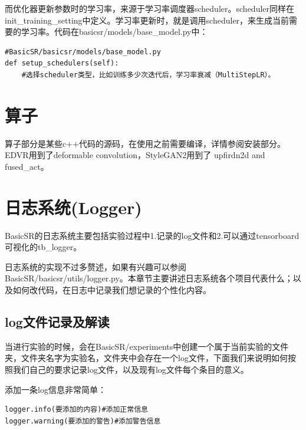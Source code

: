 \documentclass[../main.tex]{subfiles}
\begin{document}
而优化器更新参数时的学习率，来源于学习率调度器scheduler。scheduler同样在init\_training\_setting中定义。学习率更新时，就是调用scheduler，来生成当前需要的学习率。代码在basicsr/models/base\_model.py中：

\begin{verbatim}
#BasicSR/basicsr/models/base_model.py
def setup_schedulers(self):
    #选择scheduler类型，比如训练多少次迭代后，学习率衰减（MultiStepLR）。
\end{verbatim}



\section{算子}

算子部分是某些c++代码的源码，在使用之前需要编译，详情参阅安装部分。
EDVR用到了deformable convolution，StyleGAN2用到了 upfirdn2d and fused\_act。

\section{日志系统(Logger)}

BasicSR的日志系统主要包括实验过程中1.记录的log文件和2.可以通过tensorboard可视化的tb\_logger。

日志系统的实现不过多赘述，如果有兴趣可以参阅BasicSR/basicsr/utils/logger.py。本章节主要讲述日志系统各个项目代表什么；以及如何改代码，在日志中记录我们想记录的个性化内容。

\subsection{log文件记录及解读}

当进行实验的时候，会在BasicSR/experiments中创建一个属于当前实验的文件夹，文件夹名字为实验名，文件夹中会存在一个log文件，下面我们来说明如何按照我们自己的要求记录log文件，以及现有log文件每个条目的意义。

\begin{hl} %

添加一条log信息非常简单：

\begin{verbatim}
logger.info(要添加的内容)#添加正常信息
logger.warning(要添加的警告)#添加警告信息
\end{verbatim}
\end{hl}
\end{document}
